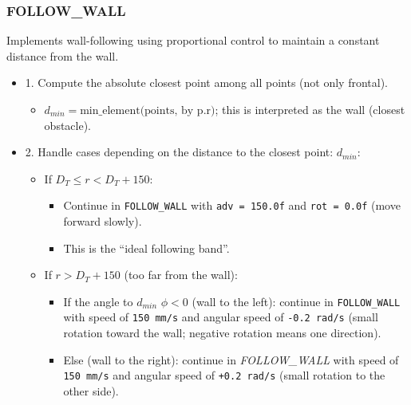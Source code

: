 \documentclass[conference]{IEEEtran}
\begin{document}
\subsubsection{FOLLOW\_WALL} Implements wall-following using proportional control to maintain a constant distance from the wall.

\begin{itemize}
    \item 1. Compute the absolute closest point among all points (not only frontal).
    \begin{itemize}
        \item $d_{min} = \text{min\_element(points, by p.r)}$; this is interpreted as the wall (closest obstacle).
    \end{itemize}
    \item 2. Handle cases depending on the distance to the closest point: $d_{min}$:
    \begin{itemize}
        \item If $D_T \leq r < D_T + 150$:
        \begin{itemize}
            \item Continue in \texttt{FOLLOW\_WALL} with \texttt{adv = 150.0f} and \texttt{rot = 0.0f} (move forward slowly).
            \item This is the “ideal following band”.
        \end{itemize}

        \item If $r > D_T + 150$ (too far from the wall):
        \begin{itemize}
            \item If the angle to $d_{min}$ $\phi < 0$ (wall to the left): continue in \texttt{FOLLOW\_WALL} with speed of \texttt{150 mm/s} and angular speed of \texttt{-0.2 rad/s} (small rotation toward the wall; negative rotation means one direction).
            \item Else (wall to the right): continue in \mbox{\textit{FOLLOW\_WALL}} with speed of \texttt{150 mm/s} and angular speed of \texttt{+0.2 rad/s} (small rotation to the other side).
        \end{itemize}


\end{itemize}
\end{itemize}
\end{document}
